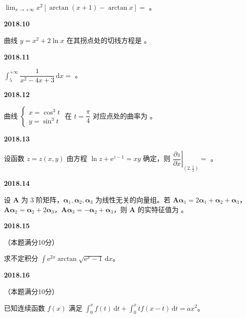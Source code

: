 \documentclass[UTF8,12pt,fontset=windows]{ctexart}
\begin{document}
$\lim_{x\to+\infty} x^2\left[\arctan(x+1) - \arctan x\right] =$ \underline{\hspace{20mm}}。

\vfill
\newpage
{\large\bfseries 2018.10}

曲线 $y = x^2 + 2\ln x$ 在其拐点处的切线方程是 \underline{\hspace{20mm}}。

\vfill
\newpage
{\large\bfseries 2018.11}

$\int_{5}^{+\infty} \dfrac{1}{x^2 - 4x + 3}\,\mathrm{d}x =$ \underline{\hspace{20mm}}。

\vfill
\newpage
{\large\bfseries 2018.12}

曲线 $\begin{cases} x = \cos^3 t \\ y = \sin^3 t \end{cases}$ 在 $t = \dfrac{\pi}{4}$ 对应点处的曲率为 \underline{\hspace{20mm}}。

\vfill
\newpage
{\large\bfseries 2018.13}

设函数 $z = z(x,y)$ 由方程 $\ln z + \mathrm{e}^{z-1} = xy$ 确定，则 $\left.\dfrac{\partial z}{\partial x}\right|_{\left(2, \frac{1}{2}\right)} =$ \underline{\hspace{20mm}}。

\vfill
\newpage
{\large\bfseries 2018.14}

设 $\boldsymbol{A}$ 为 3 阶矩阵，$\boldsymbol{\alpha}_1, \boldsymbol{\alpha}_2, \boldsymbol{\alpha}_3$ 为线性无关的向量组。若 $\boldsymbol{A}\boldsymbol{\alpha}_1 = 2\boldsymbol{\alpha}_1 + \boldsymbol{\alpha}_2 + \boldsymbol{\alpha}_3$，$\boldsymbol{A}\boldsymbol{\alpha}_2 = \boldsymbol{\alpha}_2 + 2\boldsymbol{\alpha}_3$，$\boldsymbol{A}\boldsymbol{\alpha}_3 = -\boldsymbol{\alpha}_2 + \boldsymbol{\alpha}_3$，则 $\boldsymbol{A}$ 的实特征值为 \underline{\hspace{20mm}}。

\vfill
\newpage
{\large\bfseries 2018.15}

（本题满分10分）

求不定积分 $\int \mathrm{e}^{2x}\arctan\sqrt{\mathrm{e}^x - 1}\,\mathrm{d}x$。

\vfill
\newpage
{\large\bfseries 2018.16}

（本题满分10分）

已知连续函数 $f(x)$ 满足 $\int_{0}^{x} f(t)\,\mathrm{d}t + \int_{0}^{x} tf(x-t)\,\mathrm{d}t = ax^2$。
\end{document}

